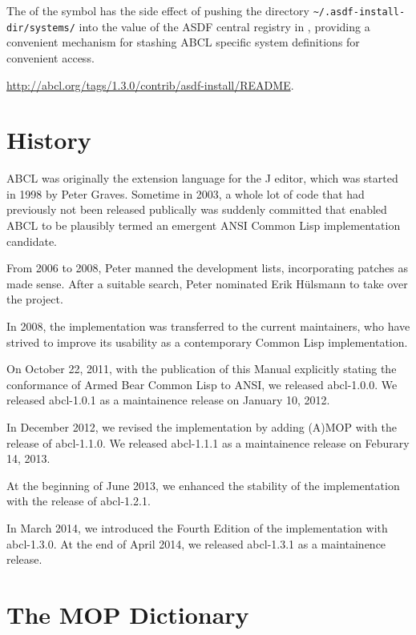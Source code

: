 \documentclass[10pt]{book}
\begin{document}
The  of the  symbol has the side
effect of pushing the directory \verb+~/.asdf-install-dir/systems/+ into
the value of the \textsc{ASDF} central registry in
, providing a convenient mechanism for
stashing \textsc{ABCL} specific system definitions for convenient
access.

\url{http://abcl.org/tags/1.3.0/contrib/asdf-install/README}.


\chapter{History}

\textsc{ABCL} was originally the extension language for the J editor, which was
started in 1998 by Peter Graves.  Sometime in 2003, a whole lot of
code that had previously not been released publically was suddenly
committed that enabled ABCL to be plausibly termed an emergent ANSI
Common Lisp implementation candidate.

From 2006 to 2008, Peter manned the development lists, incorporating
patches as made sense.  After a suitable search, Peter nominated Erik
H\"{u}lsmann to take over the project.

In 2008, the implementation was transferred to the current
maintainers, who have strived to improve its usability as a
contemporary Common Lisp implementation.

On October 22, 2011, with the publication of this Manual explicitly
stating the conformance of Armed Bear Common Lisp to \textsc{ANSI}, we
released abcl-1.0.0.  We released abcl-1.0.1 as a maintainence release
on January 10, 2012.

In December 2012, we revised the implementation by adding
\textsc{(A)MOP} with the release of abcl-1.1.0.  We released
abcl-1.1.1 as a maintainence release on Feburary 14, 2013.

At the beginning of June 2013, we enhanced the stability of the
implementation with the release of abcl-1.2.1.

In March 2014, we introduced the Fourth Edition of the implementation
with abcl-1.3.0.  At the end of April 2014, we released abcl-1.3.1 as
a maintainence release.

\appendix 

\chapter{The MOP Dictionary}
\end{document}
